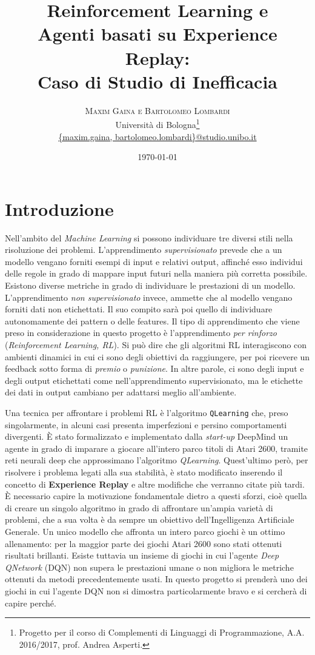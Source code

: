 \documentclass[twoside,twocolumn,10pt]{extarticle}
\title{Reinforcement Learning e\\ Agenti basati su Experience Replay:\\ Caso di Studio di Inefficacia} %
\author{%
\textsc{Maxim Gaina e Bartolomeo Lombardi} \\[1ex] %
\normalsize Università di Bologna\thanks{Progetto per il corso di Complementi di Linguaggi di Programmazione, A.A. 2016/2017, prof. Andrea Asperti.} \\ %
\normalsize \href{mailto:maxim.gaina@studio.unibo.it}{\{maxim.gaina, bartolomeo.lombardi\}@studio.unibo.it}
}
\date{\today} %
\theoremstyle{definition}
\begin{document}
\maketitle

\tableofcontents

\section*{Introduzione}
	\lettrine[nindent = 0.4em,lines=3]{N}\space\MakeTextLowercase{e}ll'ambito del \textit{Machine Learning} si possono individuare tre diversi stili nella risoluzione dei problemi. L'apprendimento \textit{supervisionato} prevede che a un modello vengano forniti esempi di input e relativi output, affinché esso individui delle regole in grado di mappare input futuri nella maniera più corretta possibile. Esistono diverse metriche in grado di individuare le prestazioni di un modello. L'apprendimento \textit{non supervisionato} invece, ammette che al modello vengano forniti dati non etichettati. Il suo compito sarà poi quello di individuare autonomamente dei pattern o delle features. Il tipo di apprendimento che viene preso in considerazione in questo progetto è l'apprendimento \textit{per rinforzo} (\textit{Reinforcement Learning, RL}). Si può dire che gli algoritmi RL interagiscono con ambienti dinamici in cui ci sono degli obiettivi da raggiungere, per poi ricevere un feedback sotto forma di \textit{premio} o \textit{punizione}. In altre parole, ci sono degli input e degli output etichettati come nell'apprendimento supervisionato, ma le etichette dei dati in output cambiano per adattarsi meglio all'ambiente.
	
	Una tecnica per affrontare i problemi RL è l'algoritmo \texttt{Q\texttwelveudash Learning} che, preso singolarmente, in alcuni casi presenta imperfezioni e persino comportamenti divergenti. È stato formalizzato e implementato dalla \textit{start-up} DeepMind un agente in grado di imparare a giocare all'intero parco titoli di Atari 2600, tramite reti neurali deep che approssimano l'algoritmo \textit{Q\texttwelveudash Learning}. Quest'ultimo però, per risolvere i problema legati alla sua stabilità, è stato modificato inserendo il concetto di \textbf{Experience Replay} e altre modifiche che verranno citate più tardi. È necessario capire la motivazione fondamentale dietro a questi sforzi, cioè quella di creare un singolo algoritmo in grado di affrontare un'ampia varietà di problemi, che a sua volta è da sempre un obiettivo dell'Ingelligenza Artificiale Generale. Un unico modello che affronta un intero parco giochi è un ottimo allenamento: per la maggior parte dei giochi Atari 2600 sono stati ottenuti risultati brillanti. Esiste tuttavia un insieme di giochi in cui l'agente \textit{Deep Q\texttwelveudash Network} (DQN) non supera le prestazioni umane o non migliora le metriche ottenuti da metodi precedentemente usati. In questo progetto si prenderà uno dei giochi in cui l'agente DQN non si dimostra particolarmente bravo e si cercherà di capire perché.
	
\end{document}
